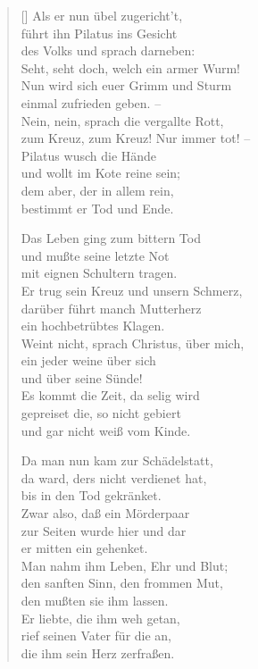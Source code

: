 \begin{multicols}{2}
\begin{verse}[\versewidth]
 Als er nun übel zugericht't,\\
führt ihn Pilatus ins Gesicht\\
des Volks und sprach darneben:\\
Seht, seht doch, welch ein armer Wurm!\\
Nun wird sich euer Grimm und Sturm\\
einmal zufrieden geben. –\\
Nein, nein, sprach die vergallte Rott,\\
zum Kreuz, zum Kreuz! Nur immer tot! –\\
Pilatus wusch die Hände\\
und wollt im Kote reine sein;\\
dem aber, der in allem rein,\\
bestimmt er Tod und Ende.

 Das Leben ging zum bittern Tod\\
und mußte seine letzte Not\\
mit eignen Schultern tragen.\\
Er trug sein Kreuz und unsern Schmerz,\\
darüber führt manch Mutterherz\\
ein hochbetrübtes Klagen.\\
Weint nicht, sprach Christus, über mich,\\
ein jeder weine über sich\\
und über seine Sünde!\\
Es kommt die Zeit, da selig wird\\
gepreiset die, so nicht gebiert\\
und gar nicht weiß vom Kinde. 

 Da man nun kam zur Schädelstatt,\\
da ward, ders nicht verdienet hat,\\
bis in den Tod gekränket.\\
Zwar also, daß ein Mörderpaar\\
zur Seiten wurde hier und dar\\
er mitten ein gehenket.\\
Man nahm ihm Leben, Ehr und Blut;\\
den sanften Sinn, den frommen Mut,\\
den mußten sie ihm lassen.\\
Er liebte, die ihm weh getan,\\
rief seinen Vater für die an,\\
die ihm sein Herz zerfraßen.


\end{verse}
\end{multicols}
